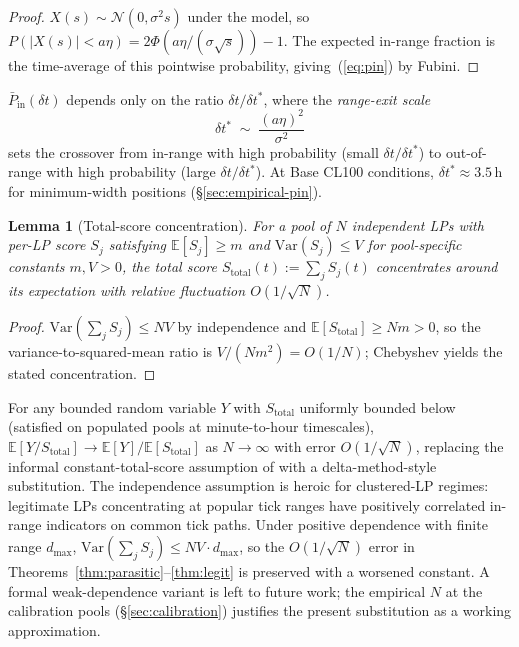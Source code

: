 \documentclass[11pt,a4paper]{article}
\theoremstyle{definition}
\theoremstyle{plain}
\newtheorem{lemma}{Lemma}
\theoremstyle{remark}
\begin{document}
\begin{proof}
$X(s) \sim \mathcal{N}(0, \sigma^2 s)$ under the model, so $P(|X(s)| < a\eta) = 2\Phi(a\eta/(\sigma\sqrt{s})) - 1$. The expected in-range fraction is the time-average of this pointwise probability, giving~(\ref{eq:pin}) by Fubini.
\end{proof}

$\bar P_{\text{in}}(\delta t)$ depends only on the ratio $\delta t/\delta t^*$, where the \emph{range-exit scale}
\begin{equation}\label{eq:exitscale}
\delta t^* \;\sim\; \frac{(a\eta)^2}{\sigma^2}
\end{equation}
sets the crossover from in-range with high probability (small $\delta t/\delta t^*$) to out-of-range with high probability (large $\delta t/\delta t^*$). At Base CL100 conditions, $\delta t^* \approx 3.5$\,h for minimum-width positions (\S\ref{sec:empirical-pin}).

\begin{lemma}[Total-score concentration]\label{lem:meanfield}
For a pool of $N$ independent LPs with per-LP score $S_j$ satisfying $\mathbb{E}[S_j] \geq m$ and $\mathrm{Var}(S_j) \leq V$ for pool-specific constants $m, V > 0$, the total score $S_{\text{total}}(t) := \sum_j S_j(t)$ concentrates around its expectation with relative fluctuation $O(1/\sqrt{N})$.
\end{lemma}

\begin{proof}
$\mathrm{Var}(\sum_j S_j) \leq NV$ by independence and $\mathbb{E}[S_{\text{total}}] \geq Nm > 0$, so the variance-to-squared-mean ratio is $V/(Nm^2) = O(1/N)$; Chebyshev yields the stated concentration.
\end{proof}

For any bounded random variable $Y$ with $S_{\text{total}}$ uniformly bounded below (satisfied on populated pools at minute-to-hour timescales), $\mathbb{E}[Y/S_{\text{total}}] \to \mathbb{E}[Y]/\mathbb{E}[S_{\text{total}}]$ as $N \to \infty$ with error $O(1/\sqrt{N})$, replacing the informal constant-total-score assumption of \cite{ryan2026c} with a delta-method-style substitution. The independence assumption is heroic for clustered-LP regimes: legitimate LPs concentrating at popular tick ranges have positively correlated in-range indicators on common tick paths. Under positive dependence with finite range $d_{\max}$, $\mathrm{Var}(\sum_j S_j) \leq NV \cdot d_{\max}$, so the $O(1/\sqrt N)$ error in Theorems~\ref{thm:parasitic}--\ref{thm:legit} is preserved with a worsened constant. A formal weak-dependence variant is left to future work; the empirical $N$ at the calibration pools (\S\ref{sec:calibration}) justifies the present substitution as a working approximation.
\end{document}
